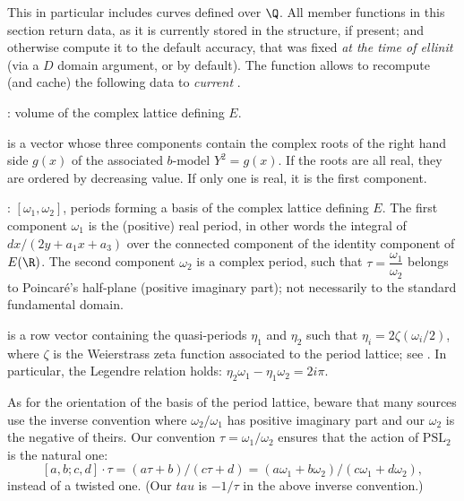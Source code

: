 
This in particular includes curves defined over $\Q$. All member functions in
this section return data, as it is currently stored in the structure, if
present; and otherwise compute it to the default accuracy, that was fixed
\emph{at the time of ellinit} (via a  $D$ domain argument, or
 by default). The function  allows to
recompute (and cache) the following data to \emph{current}
.

\item {}: volume of the complex lattice defining $E$.

\item {} is a vector whose three components contain the complex
roots of the right hand side $g(x)$ of the associated $b$-model $Y^2 = g(x)$.
If the roots are all real, they are ordered by decreasing value. If only one
is real, it is the first component.

\item {}: $[\omega_1,\omega_2]$, periods forming a basis of the
complex lattice defining $E$. The first component $\omega_1$ is the
(positive) real period, in other words the integral of $dx/(2y+a_1x+a_3)$
over the connected component of the identity component of $E(\R)$.
The second component $\omega_2$ is a complex period, such that
$\tau=\dfrac{\omega_1}{\omega_2}$ belongs to Poincar\'e's
half-plane (positive imaginary part); not necessarily to the standard
fundamental domain.

\item {} is a row vector containing the quasi-periods $\eta_1$ and
$\eta_2$ such that $\eta_i = 2\zeta(\omega_i/2)$, where $\zeta$ is the
Weierstrass zeta function associated to the period lattice; see
. In particular, the Legendre relation holds: $\eta_2\omega_1 -
\eta_1\omega_2 = 2i\pi$.

 As for the orientation of the basis of the period lattice,
beware that many sources use the inverse convention where $\omega_2/\omega_1$
has positive imaginary part and our $\omega_2$ is the negative of theirs. Our
convention $\tau = \omega_1/\omega_2$  ensures that the action of $\text{PSL}_2$ is the natural
one:
$$[a,b;c,d]\cdot\tau = (a\tau+b)/(c\tau+d)
  = (a \omega_1 + b\omega_2)/(c\omega_1 + d\omega_2),$$
instead of a twisted one. (Our $tau$ is $-1/\tau$ in the above inverse
convention.)


